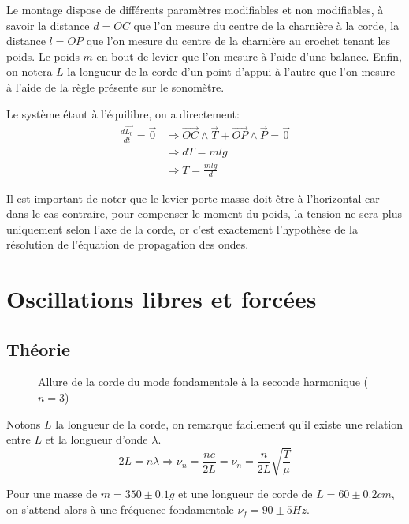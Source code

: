 \documentclass[12pt]{article}
\begin{document}
Le montage dispose de différents paramètres modifiables et non modifiables, à savoir la distance $d=OC$ que l'on mesure du centre de la charnière à la corde, la distance $l=OP$ que l'on mesure
du centre de la charnière au crochet tenant les poids. Le poids $m$ en bout de levier que l'on mesure à l'aide d'une balance. Enfin, on notera $L$ la longueur de la corde d'un point d'appui à l'autre que
l'on mesure à l'aide de la règle présente sur le sonomètre.

Le système étant à l'équilibre, on a directement:
\begin{align*}
    \frac{d \vec{L_0}}{dt} = \vec{0} & \Rightarrow \vec{OC} \wedge \vec{T} + \vec{OP} \wedge \vec{P} = \vec{0} \\
    & \Rightarrow dT = mlg \\
    & \Rightarrow T = \frac{mlg}{d}
\end{align*}

Il est important de noter que le levier porte-masse doit être à l'horizontal car dans le cas contraire, pour compenser le moment du poids, la tension ne sera plus
uniquement selon l'axe de la corde, or c'est exactement l'hypothèse de la résolution de l'équation de propagation des ondes. 

\break
\section{Oscillations libres et forcées}
\subsection{Théorie}
\begin{figure}[!h]
    \begin{center}
        \resizebox{0.8\textwidth}{3.2cm}{
            
        }
    \end{center}
    \caption{Allure de la corde du mode fondamentale à la seconde harmonique ($n=3$)}
    \label{fig:mode_fonda}
\end{figure}

Notons $L$ la longueur de la corde, on remarque facilement qu'il existe une relation entre $L$ et la longueur d'onde $\lambda$.
\begin{equation}
    2L = n\lambda \Rightarrow \nu_n = \frac{nc}{2L} = \nu_n = \frac{n}{2L}\sqrt{\frac{T}{\mu}}
\end{equation}

Pour une masse de $m=350 \pm 0.1g$ et une longueur de corde de $L=60 \pm 0.2cm$, on s'attend alors à une fréquence fondamentale $\nu_f = 90 \pm 5 Hz$.
\end{document}
